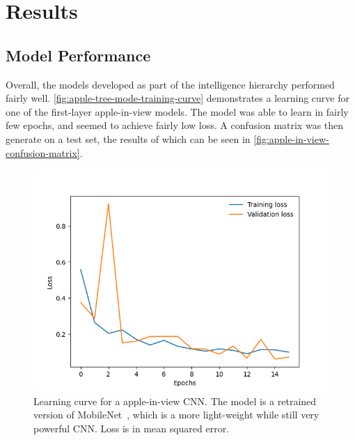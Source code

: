 \section{Results}\label{sec:results}

\subsection{Model Performance}\label{subsec:model-performance}
Overall, the models developed as part of the intelligence hierarchy performed fairly
well.
\autoref{fig:apple-tree-mode-training-curve} demonstrates a learning curve for one of
the first-layer apple-in-view models.
The model was able to learn in fairly few epochs, and seemed to achieve fairly low loss.
A confusion matrix was then generate on a test set, the results of which can be seen
in \autoref{fig:apple-in-view-confusion-matrix}.

\begin{figure}[!htb]
    \centering
    \includegraphics[width=\columnwidth,keepaspectratio]
    {./figures/mobile_model_apple_trees_16its_2022-11-15_training_curve}
    \caption{
        Learning curve for a apple-in-view CNN.
        The model is a retrained version of MobileNet~\cite{Sandler2018,
            PyTorchMobileNet}, which is a more light-weight while still very powerful
        CNN.
        Loss is in mean squared error.
    }
    \label{fig:apple-tree-mode-training-curve}
\end{figure}

